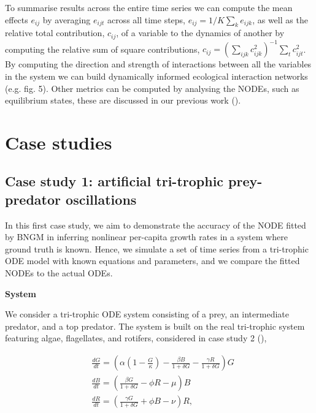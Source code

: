 \documentclass[11pt, oneside]{article}
\begin{document}
To summarise results across the entire time series we can compute the mean effects $e_{ij}$ by averaging $e_{ijt}$ across all time steps, $e_{ij} = 1/K \sum_k e_{ijk}$, as well as the relative total contribution, $c_{ij}$, of a variable to the dynamics of another by computing the relative sum of square contributions, $c_{ij} = \left( \sum_{ijk} c_{ijk}^{2} \right)^{-1} \sum_t c_{ijt}^2$. 
By computing the direction and strength of interactions between all the variables in the system we can build dynamically informed ecological interaction networks (e.g. fig. 5).
Other metrics can be computed by analysing the NODEs, such as equilibrium states, these are discussed in our previous work (\cite{Bonnaffe2021a}). 

\section{Case studies}

\subsection{Case study 1: artificial tri-trophic prey-predator oscillations}

In this first case study, we aim to demonstrate the accuracy of the NODE fitted by BNGM in inferring nonlinear per-capita growth rates in a system where ground truth is known.
Hence, we simulate a set of time series from a tri-trophic ODE model with known equations and parameters, and we compare the fitted NODEs to the actual ODEs.

\textbf{System}

We consider a tri-trophic ODE system consisting of a prey, an intermediate predator, and a top predator.
The system is built on the real tri-trophic system featuring algae, flagellates, and rotifers, considered in case study 2 (\cite{Hiltunen2013}),

\vspace{-0.5cm}
\begin{equation} \begin{aligned}
    & \frac{dG}{dt} = \left( \alpha \left(1-\frac{G}{\kappa}\right) - \frac{\beta B}{1+\delta G} - \frac{\gamma R}{1+\delta G} \right) G\\
    & \frac{dB}{dt} = \left( \frac{\beta G}{1+\delta G} - \phi R - \mu \right) B \\
	& \frac{dR}{dt} = \left( \frac{\gamma G}{1+\delta G} + \phi B - \nu \right) R,
\end{aligned} \end{equation}
\end{document}
